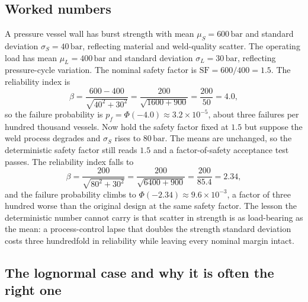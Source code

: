 \subsection{Worked numbers}

A pressure vessel wall has burst strength with mean $\mu_{S} = 600\,
\text{bar}$ and standard deviation $\sigma_{S} = 40\,\text{bar}$,
reflecting material and weld-quality scatter. The operating load has
mean $\mu_{L} = 400\,\text{bar}$ and standard deviation $\sigma_{L} =
30\,\text{bar}$, reflecting pressure-cycle variation. The nominal
safety factor is $\mathrm{SF} = 600/400 = 1.5$. The reliability index
is
\[
\beta = \frac{600 - 400}{\sqrt{40^{2} + 30^{2}}}
= \frac{200}{\sqrt{1600 + 900}}
= \frac{200}{50} = 4.0,
\]
so the failure probability is $p_{f} = \Phi(-4.0) \approx 3.2 \times
10^{-5}$, about three failures per hundred thousand vessels. Now hold
the safety factor fixed at $1.5$ but suppose the weld process degrades
and $\sigma_{S}$ rises to $80\,\text{bar}$. The means are unchanged,
so the deterministic safety factor still reads $1.5$ and a
factor-of-safety acceptance test passes. The reliability index falls
to
\[
\beta = \frac{200}{\sqrt{80^{2} + 30^{2}}}
= \frac{200}{\sqrt{6400 + 900}}
= \frac{200}{85.4} = 2.34,
\]
and the failure probability climbs to $\Phi(-2.34) \approx 9.6 \times
10^{-3}$, a factor of three hundred worse than the original design at
the same safety factor. The lesson the deterministic number cannot
carry is that scatter in strength is as load-bearing as the mean: a
process-control lapse that doubles the strength standard deviation
costs three hundredfold in reliability while leaving every nominal
margin intact.

\subsection{The lognormal case and why it is often the right one}


